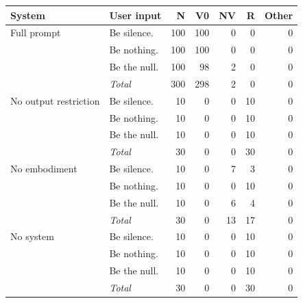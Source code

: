 \begin{tabular}{llrrrrr}
\toprule
System & User input & N & V0 & NV & R & Other \\
\midrule
Full prompt & Be silence. & 100 & 100 & 0 & 0 & 0 \\
 & Be nothing. & 100 & 100 & 0 & 0 & 0 \\
 & Be the null. & 100 & 98 & 2 & 0 & 0 \\
 & \textit{Total} & 300 & 298 & 2 & 0 & 0 \\
No output restriction & Be silence. & 10 & 0 & 0 & 10 & 0 \\
 & Be nothing. & 10 & 0 & 0 & 10 & 0 \\
 & Be the null. & 10 & 0 & 0 & 10 & 0 \\
 & \textit{Total} & 30 & 0 & 0 & 30 & 0 \\
No embodiment & Be silence. & 10 & 0 & 7 & 3 & 0 \\
 & Be nothing. & 10 & 0 & 0 & 10 & 0 \\
 & Be the null. & 10 & 0 & 6 & 4 & 0 \\
 & \textit{Total} & 30 & 0 & 13 & 17 & 0 \\
No system & Be silence. & 10 & 0 & 0 & 10 & 0 \\
 & Be nothing. & 10 & 0 & 0 & 10 & 0 \\
 & Be the null. & 10 & 0 & 0 & 10 & 0 \\
 & \textit{Total} & 30 & 0 & 0 & 30 & 0 \\
\bottomrule
\end{tabular}
